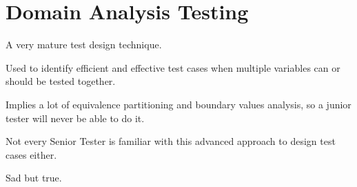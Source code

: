 \section{Domain Analysis Testing}
\label{sec:Domain Analysis Testing}

A very mature test design technique.

Used to identify efficient and effective test cases when multiple variables can or should be tested together.

Implies a lot of equivalence partitioning and boundary values analysis, so a junior tester will never be able to do it.

Not every Senior Tester is familiar with this advanced approach to design test cases either.

Sad but true.